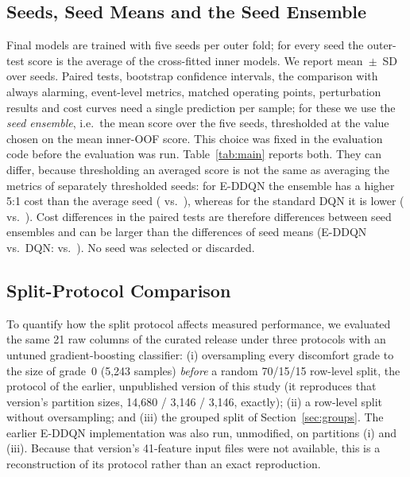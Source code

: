 \subsection{Seeds, Seed Means and the Seed Ensemble}
\label{sec:seeds}
Final models are trained with five seeds per outer fold; for every seed the outer-test score is the average of the \nInner{} cross-fitted inner models. We report mean~$\pm$~SD over seeds. Paired tests, bootstrap confidence intervals, the comparison with always alarming, event-level metrics, matched operating points, perturbation results and cost curves need a single prediction per sample; for these we use the \emph{seed ensemble}, i.e.\ the mean score over the five seeds, thresholded at the value chosen on the mean inner-OOF score. This choice was fixed in the evaluation code before the evaluation was run. Table~\ref{tab:main} reports both. They can differ, because thresholding an averaged score is not the same as averaging the metrics of separately thresholded seeds: for E-DDQN the ensemble has a higher 5:1 cost than the average seed (\PHEnsEDDQNCost{} vs.\ \EDDQNCostCostMean), whereas for the standard DQN it is lower (\PHEnsDQNCost{} vs.\ \DQNCostCostMean). Cost differences in the paired tests are therefore differences between seed ensembles and can be larger than the differences of seed means (E-DDQN vs.\ DQN: \PHEnsDiffDQN{} vs.\ \PHMeanDiffDQN). No seed was selected or discarded.

\subsection{Split-Protocol Comparison}
To quantify how the split protocol affects measured performance, we evaluated the same 21 raw columns of the curated release under three protocols with an untuned gradient-boosting classifier: (i) oversampling every discomfort grade to the size of grade~0 (5,243 samples) \emph{before} a random 70/15/15 row-level split, the protocol of the earlier, unpublished version of this study (it reproduces that version's partition sizes, 14,680 / 3,146 / 3,146, exactly); (ii) a row-level split without oversampling; and (iii) the grouped split of Section~\ref{sec:groups}. The earlier E-DDQN implementation was also run, unmodified, on partitions (i) and (iii). Because that version's 41-feature input files were not available, this is a reconstruction of its protocol rather than an exact reproduction.
